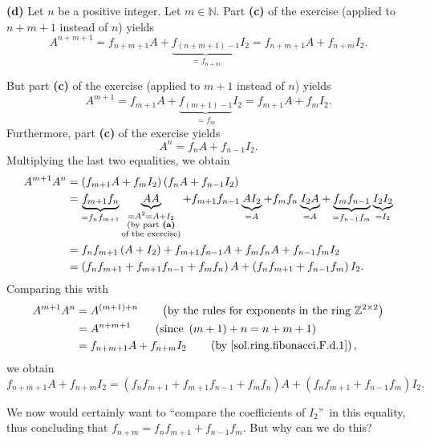\documentclass[paper=a4, fontsize=12pt]{scrartcl}%
\theoremstyle{plainsl}
\theoremstyle{definition}
\theoremstyle{remark}
\begin{document}
\bigskip

\textbf{(d)} Let $n$ be a positive integer. Let $m\in\mathbb{N}$. Part
\textbf{(c)} of the exercise (applied to $n+m+1$ instead of $n$) yields%
\begin{equation}
A^{n+m+1}=f_{n+m+1}A+\underbrace{f_{\left(  n+m+1\right)  -1}}_{=f_{n+m}}%
I_{2}=f_{n+m+1}A+f_{n+m}I_{2}. \label{sol.ring.fibonacci.F.d.1}%
\end{equation}


But part \textbf{(c)} of the exercise (applied to $m+1$ instead of $n$) yields%
\[
A^{m+1}=f_{m+1}A+\underbrace{f_{\left(  m+1\right)  -1}}_{=f_{m}}I_{2}%
=f_{m+1}A+f_{m}I_{2}.
\]
Furthermore, part \textbf{(c)} of the exercise yields%
\[
A^{n}=f_{n}A+f_{n-1}I_{2}.
\]
Multiplying the last two equalities, we obtain%
\begin{align*}
A^{m+1}A^{n}  &  =\left(  f_{m+1}A+f_{m}I_{2}\right)  \left(  f_{n}%
A+f_{n-1}I_{2}\right) \\
&  =\underbrace{f_{m+1}f_{n}}_{=f_{n}f_{m+1}}\underbrace{AA}_{\substack{=A^{2}%
=A+I_{2}\\\text{(by part \textbf{(a)}}\\\text{of the exercise)}}%
}+f_{m+1}f_{n-1}\underbrace{AI_{2}}_{=A}+f_{m}f_{n}\underbrace{I_{2}A}%
_{=A}+\underbrace{f_{m}f_{n-1}}_{=f_{n-1}f_{m}}\underbrace{I_{2}I_{2}}%
_{=I_{2}}\\
&  =f_{n}f_{m+1}\left(  A+I_{2}\right)  +f_{m+1}f_{n-1}A+f_{m}f_{n}%
A+f_{n-1}f_{m}I_{2}\\
&  =\left(  f_{n}f_{m+1}+f_{m+1}f_{n-1}+f_{m}f_{n}\right)  A+\left(
f_{n}f_{m+1}+f_{n-1}f_{m}\right)  I_{2}.
\end{align*}
Comparing this with%
\begin{align*}
A^{m+1}A^{n}  &  =A^{\left(  m+1\right)  +n}\qquad\left(  \text{by the rules
for exponents in the ring }\mathbb{Z}^{2\times2}\right) \\
&  =A^{n+m+1}\qquad\left(  \text{since }\left(  m+1\right)  +n=n+m+1\right) \\
&  =f_{n+m+1}A+f_{n+m}I_{2}\qquad\left(  \text{by
\eqref{sol.ring.fibonacci.F.d.1}}\right)  ,
\end{align*}
we obtain%
\begin{equation}
f_{n+m+1}A+f_{n+m}I_{2}=\left(  f_{n}f_{m+1}+f_{m+1}f_{n-1}+f_{m}f_{n}\right)
A+\left(  f_{n}f_{m+1}+f_{n-1}f_{m}\right)  I_{2}.
\label{sol.ring.fibonacci.F.d.3}%
\end{equation}


We now would certainly want to \textquotedblleft compare the coefficients of
$I_{2}$\textquotedblright\ in this equality, thus concluding that
$f_{n+m}=f_{n}f_{m+1}+f_{n-1}f_{m}$. But why can we do this?
\end{document}
